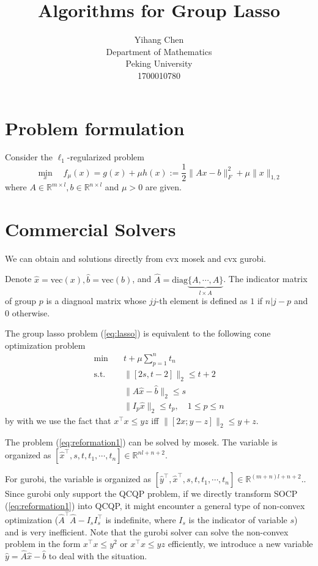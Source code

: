 \documentclass{article}
\title{Algorithms for Group Lasso}
\author{%
  Yihang Chen \\
  Department of Mathematics\\
  Peking University\\
  1700010780\\
}
\numberwithin{equation}{section}
\numberwithin{figure}{section}
\begin{document}
\maketitle
\tableofcontents
\clearpage
\section{Problem formulation}

\begin{tcolorbox}[colback=blue!5!white,colframe=blue!75!black,title= Lasso]
Consider the $\ell_1$-regularized problem
\begin{equation}
    \min_x\quad f_\mu(x) = g(x)+\mu h(x):= \frac{1}{2}\|Ax-b\|_F^2+\mu\|x\|_{1,2} \label{eq:lasso}
\end{equation}
where $A\in \mathbb{R}^{m\times l},b\in \mathbb{R}^{n\times l}$ and $\mu>0$ are given.
\end{tcolorbox}

\section{Commercial Solvers}
We can obtain and solutions directly from cvx mosek and cvx gurobi. 

Denote $\hat{x}=\mathrm{vec}(x),\hat{b}=\mathrm{vec}(b)$, and $\hat{A}=\mathrm{diag}\underbrace{\{A, \cdots,A\}}_{l \times A}$. The indicator matrix of group $p$ is a diagnoal matrix whose $jj$-th element is defined as $1$ if $n|j-p$ and 0 otherwise.

The group lasso problem (\ref{eq:lasso}) is equivalent to the following cone optimization problem
\begin{equation}
\begin{split}
        \min&\quad  t+\mu \sum_{p=1}^n t_n\\
        \mathrm{s.t.}&\quad \|[2s,t-2] \|_2 \leq t+2\\ 
        &\quad \|\hat{A}\hat{x}-\hat{b}\|_2\leq s\\
        &\quad \|I_p \hat{x}\|_2\leq t_p, \quad 1\leq p \leq n
\end{split}\label{eq:reformation1}
\end{equation}
by with we use the fact that $x^\top x\leq yz$ iff $\|[2x;y-z]\|_2\leq y+z$.

The problem (\ref{eq:reformation1}) can be solved by mosek. The variable is organized as $[\hat{x}^\top,s,t,t_1,\cdots,t_n]\in \mathbb{R}^{nl+n+2}$.

For gurobi, the variable is organized as $[\hat{y}^\top,\hat{x}^\top,s,t,t_1,\cdots,t_n]\in \mathbb{R}^{(m+n)l+n+2}$.. Since gurobi only support the QCQP problem, if we directly transform SOCP (\ref{eq:reformation1}) into QCQP, it might encounter a general type of non-convex optimization ($\hat{A}^\top \hat{A}-I_s I_s^\top$ is indefinite, where $I_s$ is the indicator of variable $s$) and is very inefficient. Note that the gurobi solver can solve the non-convex problem in the form $x^\top x\leq y^2$ or $x^\top x\leq yz$ efficiently, we introduce a new variable $ \hat{y} = \hat{A}\hat{x}-\hat{b}$ to deal with the situation. 
\end{document}
